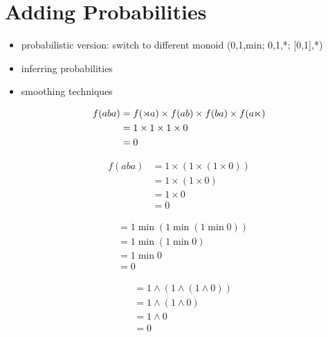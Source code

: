 \chapter{Adding Probabilities}
\label{cha:PSL}

\begin{itemize}
    \item probabilistic version: switch to different monoid (0,1,min; 0,1,*; [0,1],*)
    \item inferring probabilities
    \item smoothing techniques
\end{itemize}

\begin{align*}
    f(aba) & =
            f(\rtimes a)
            \times
            f(ab)
            \times
            f(ba)
            \times
            f(a\ltimes)
            \\
            & =
            1
            \times
            1
            \times
            1
            \times
            0
            \\
            & =
            0
\end{align*}

\begin{center}
    \begin{minipage}{.35\linewidth}
        \begin{align*}
            f(aba)
            &= 1 \times (1 \times (1 \times 0)) \\
            &= 1 \times (1 \times 0) \\
            &= 1 \times 0\\
            &= 0
        \end{align*}
    \end{minipage}
    \begin{minipage}{.2\linewidth}
        \begin{align*}
            &= 1 \mathrel{\text{min}} (1 \mathrel{\text{min}} (1 \mathrel{\text{min}} 0)) \\
            &= 1 \mathrel{\text{min}} (1 \mathrel{\text{min}} 0) \\
            &= 1 \mathrel{\text{min}} 0\\
            &= 0
        \end{align*}
    \end{minipage}
    \begin{minipage}{.25\linewidth}
        \begin{align*}
            &= 1 \wedge (1 \wedge (1 \wedge 0)) \\
            &= 1 \wedge (1 \wedge 0) \\
            &= 1 \wedge 0\\
            &= 0
        \end{align*}
    \end{minipage}
\end{center}

